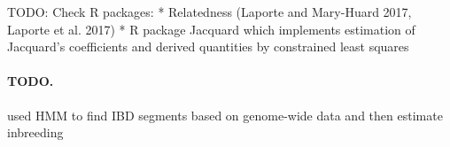 %
%

TODO: Check R packages:
  * Relatedness (Laporte and Mary-Huard 2017, Laporte et al. 2017)
  * R package Jacquard which implements estimation of Jacquard’s coefficients and derived quantities by constrained least squares

\paragraph*{TODO.}

\cite{leutenegger2003estimation} used HMM to find IBD segments based on genome-wide data and then estimate inbreeding

